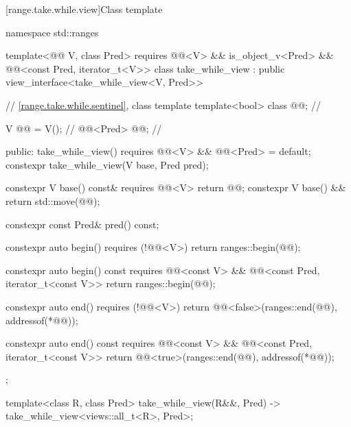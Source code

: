 [range.take.while.view]{Class template }

%
%
%
%
\begin{codeblock}
namespace std::ranges {
  template<@@ V, class Pred>
    requires @@<V> && is_object_v<Pred> &&
             @@<const Pred, iterator_t<V>>
  class take_while_view : public view_interface<take_while_view<V, Pred>> {
    // \ref{range.take.while.sentinel}, class template 
    template<bool> class @@;                      // \expos

    V @@ = V();                                      // \expos
    @@<Pred> @@;                           // \expos

  public:
    take_while_view() requires @@<V> && @@<Pred> = default;
    constexpr take_while_view(V base, Pred pred);

    constexpr V base() const& requires @@<V> { return @@; }
    constexpr V base() && { return std::move(@@); }

    constexpr const Pred& pred() const;

    constexpr auto begin() requires (!@@<V>)
    { return ranges::begin(@@); }

    constexpr auto begin() const
      requires @@<const V> &&
               @@<const Pred, iterator_t<const V>>
    { return ranges::begin(@@); }

    constexpr auto end() requires (!@@<V>)
    { return @@<false>(ranges::end(@@), addressof(*@@)); }

    constexpr auto end() const
      requires @@<const V> &&
               @@<const Pred, iterator_t<const V>>
    { return @@<true>(ranges::end(@@), addressof(*@@)); }
  };

  template<class R, class Pred>
    take_while_view(R&&, Pred) -> take_while_view<views::all_t<R>, Pred>;
}
\end{codeblock}

